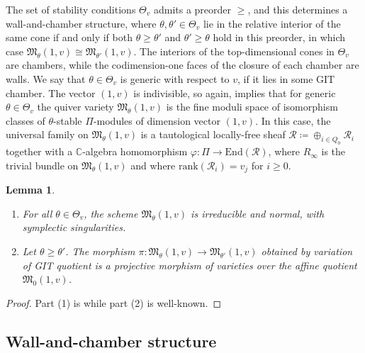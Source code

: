\documentclass[11pt]{article}
\numberwithin{equation}{section}
\newtheorem{Lemma}[Theorem]{Lemma}
\newcommand{\SC}{\mathbb{C}} %
\numberwithin{equation}{section}
\begin{document}
The set of stability conditions $\Theta_v$ admits a preorder $\geq$, and this determines a wall-and-chamber structure, where
$\theta,\theta' \in \Theta_v$ lie in the relative interior of the same cone if and only if both $\theta \geq \theta'$ and $\theta' \geq\theta$ hold in this preorder, in which case $\mathfrak{M}_{\theta}(1,v)\cong\mathfrak{M}_{\theta'}(1,v)$. The interiors of the top-dimensional cones in $\Theta_v$ are chambers, while the codimension-one faces of the closure of each chamber are walls. We say that $\theta \in \Theta_v$ is generic with respect to $v$, if it lies in some GIT chamber. The vector $(1,v)$ is indivisible, so again, \cite[Proposition~5.3]{king1994moduli} implies that for generic $\theta \in \Theta_v$ the quiver variety $\mathfrak{M}_{\theta}(1,v)$ is the fine moduli space of isomorphism classes of $\theta$-stable $\Pi$-modules of dimension vector $(1,v)$. In this case, the universal family on $\mathfrak{M}_{\theta}(1,v)$ is a tautological locally-free sheaf $\mathcal{R} \coloneqq \oplus_{i \in Q_0}\mathcal{R}_i$ together with a $\SC$-algebra homomorphism $\varphi \colon \Pi \to \mathrm{End}(\mathcal{R})$, where $R_\infty$ is the trivial bundle on $\mathfrak{M}_{\theta}(1,v)$ and where $\mathrm{rank}(\mathcal{R}_i) = v_j$ for $i \geq 0$.

\begin{Lemma}\label{lem:quiver}\quad
\begin{enumerate}\itemsep=0pt
\item[$1.$] For all $\theta \in \Theta_v$, the scheme $\mathfrak{M}_{\theta}(1,v)$ is irreducible and normal, with symplectic singularities.
\item[$2.$] Let $ \theta \geq \theta'$. The morphism $\pi\colon \mathfrak{M}_{\theta}(1,v) \to \mathfrak{M}_{\theta'}(1,v)$ obtained by variation of GIT quotient is a projective morphism of varieties over the affine quotient $\mathfrak{M}_{0}(1,v)$.
\end{enumerate}
\end{Lemma}

\begin{proof}
Part (1) is \cite[Theorem 1.2, Proposition 3.21]{bellamy2016symplectic} while part (2) is well-known.
\end{proof}

\subsection{Wall-and-chamber structure}
\label{subsec:wallandcham}
\end{document}
